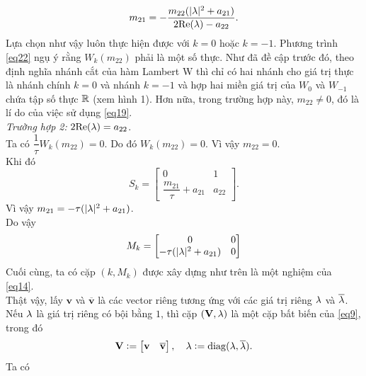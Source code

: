 \begin{equation}\label{eq23}
	m_{21} = -\dfrac{m_{22}(\vert \lambda \vert ^2 +a_{21})}{2\mathrm{Re}(\lambda)-a_{22}}.
\end{equation}
Lựa chọn như vậy luôn thực hiện được với $k = 0$ hoặc $k = -1$. Phương trình \eqref{eq22} ngụ ý rằng $W_k(m_{22})$ phải là một số thực. Như đã đề cập trước đó, theo định nghĩa nhánh cắt của hàm Lambert W thì chỉ có hai nhánh cho giá trị thực là nhánh chính $k = 0$ và nhánh $k = -1$ và hợp hai miền giá trị của $W_0$ và $W_{-1}$ chứa tập số thực $\mathbb{R}$ (xem hình 1). Hơn nữa, trong trường hợp này, $m_{22} \ne 0$, đó là lí do của việc sử dụng \eqref{eq19}.\\
%
\noindent\textit{Trường hợp 2:} $2\mathrm{Re}(\lambda) = a_{22}$.\\
Ta có $\dfrac{1}{\tau} W_k(m_{22}) = 0$. Do đó $W_k(m_{22}) =0$. Vì vậy $m_{22}=0$.\\
Khi đó
\begin{equation*}
S_k = \begin{bmatrix}
	0 &1\\
	\dfrac{m_{21}}{\tau} +a_{21} & a_{22}
\end{bmatrix}.
\end{equation*}
Vì vậy $m_{21} = - \tau(\vert \lambda \vert ^2 + a_{21})$.\\
Do vậy
\begin{equation}\label{eq24}
	M_k = \begin{bmatrix}
		0 &0\\
		- \tau(\vert \lambda \vert ^2 + a_{21}) & 0
	\end{bmatrix}
\end{equation} 
Cuối cùng, ta có cặp $(k, M_k)$ được xây dựng như trên là một nghiệm của \eqref{eq14}.\\
Thật vậy, lấy $\mathbf{v}$ và  $\mathbf{\overline{v}}$ là các vector riêng tương ứng với các giá trị riêng $\lambda$ và $\overline{\lambda}$. Nếu $\lambda$ là giá trị riêng có bội bằng $1$, thì cặp $(\mathbf{V}, \mathbf{\lambda})$ là một cặp bất biến của \eqref{eq9}, trong đó
\begin{equation}\label{eq25}
	\mathbf{V} := \begin{bmatrix}
		\mathbf{v} &\mathbf{\overline{v}}
	\end{bmatrix},
	\quad 
	\mathbf{\lambda} := \mathrm{diag} (\lambda, \overline{\lambda}).
\end{equation}
Ta có
